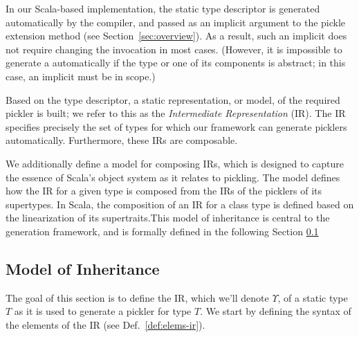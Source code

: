 In our Scala-based implementation, the static type descriptor is generated
automatically by the compiler, and passed as an implicit argument to the
pickle extension method (see Section~\ref{sec:overview}). As a result, such an
implicit \footnotemark[1] does not require changing the invocation in most cases.
(However, it is impossible to generate a  automatically if the
type or one of its components is abstract; in this case, an implicit
 must be in scope.)

Based on the type descriptor, a static representation, or model, of the
required pickler is built; we refer to this as the {\em Intermediate
Representation} (IR). The IR specifies precisely the set of types for which
our framework can generate picklers automatically. Furthermore, these IRs are composable.

We additionally define a model for composing IRs, which is designed to capture
the essence of Scala's object system as it relates to pickling. The model
defines how the IR for a given type is composed from the IRs of the picklers
of its supertypes. In Scala, the composition of an IR for a class type is
defined based on the linearization of its supertraits.\footnotemark[2]
This model of inheritance is central to the generation framework, and is
formally defined in the following Section \ref{sec:ir}



\subsection{Model of Inheritance}
\label{sec:ir}

The goal of this section is to define the IR, which we'll denote
$\Upsilon$, of a static type $T$ as it is used to generate a pickler for
type $T$. We start by defining the syntax of the elements of the IR
(see Def.~\ref{def:elems-ir}).

